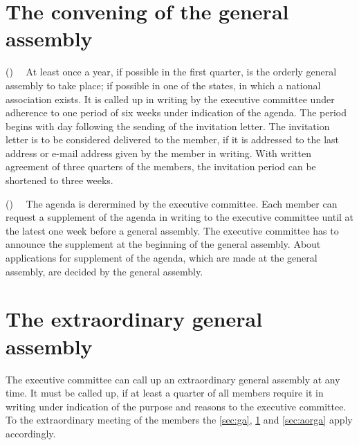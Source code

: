 \documentclass[a4wide,12pt]{article}
\newcounter{absatz}[section]
\newcommand{\A}{\par\vspace{1ex}
                \stepcounter{absatz}\noindent(\arabic{absatz})~~}
\begin{document}


\section{The convening of the general assembly}\label{sec:cga}
\A 
At least once a year, if possible in the first quarter, is the orderly
general assembly to take place; if possible in one of the states, in
which a national association exists. It is called up in writing by the
executive committee under adherence to one period of six weeks under
indication of the agenda. The period begins with day following the
sending of the invitation letter. The invitation letter is to be
considered delivered to the member, if it is addressed to the last
address or e-mail address given by the member in writing. With written
agreement of three quarters of the members, the invitation period can
be shortened to three weeks.
\A
The agenda is derermined by the executive committee. Each member can
request a supplement of the agenda in writing to the executive
committee until at the latest one week before a general assembly. The
executive committee has to announce the supplement at the beginning of
the general assembly. About applications for supplement of the agenda,
which are made at the general assembly, are decided by the general
assembly.



\section{The extraordinary general assembly}
The executive committee can call up an extraordinary general assembly
at any time.  It must be called up, if at least a quarter of all
members require it in writing under indication of the purpose and
reasons to the executive committee. To the extraordinary meeting of
the members the \ref{sec:ga}, \ref{sec:cga} and \ref{sec:aorga} apply
accordingly. 


\end{document}
